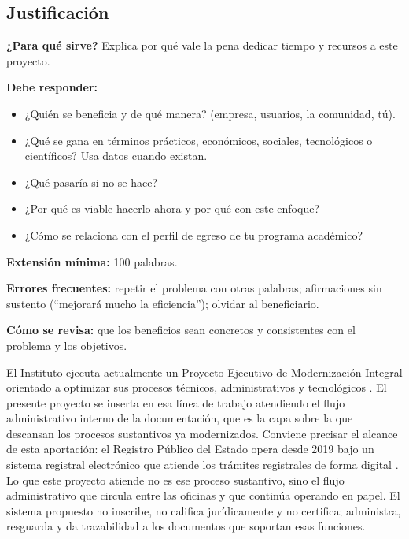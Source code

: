 \subsection{Justificación} \label{sec:justificacion} %

\begin{guia}
\textbf{¿Para qué sirve?} Explica por qué vale la pena dedicar tiempo y recursos a este proyecto.

\textbf{Debe responder:}
\begin{itemize}[nosep,leftmargin=*]
  \item ¿Quién se beneficia y de qué manera? (empresa, usuarios, la comunidad, tú).
  \item ¿Qué se gana en términos prácticos, económicos, sociales, tecnológicos o científicos? Usa datos cuando existan.
  \item ¿Qué pasaría si no se hace?
  \item ¿Por qué es viable hacerlo ahora y por qué con este enfoque?
  \item ¿Cómo se relaciona con el perfil de egreso de tu programa académico?
\end{itemize}

\textbf{Extensión mínima:} 100 palabras.

\textbf{Errores frecuentes:} repetir el problema con otras palabras; afirmaciones sin sustento (``mejorará mucho la
eficiencia''); olvidar al beneficiario.

\textbf{Cómo se revisa:} que los beneficios sean concretos y consistentes con el problema y los objetivos.
\end{guia}

El Instituto ejecuta actualmente un Proyecto Ejecutivo de Modernización Integral orientado a optimizar sus procesos técnicos, administrativos y tecnológicos \cite{tamaulipas2025mod}. El presente proyecto se inserta en esa línea de trabajo atendiendo el flujo administrativo interno de la documentación, que es la capa sobre la que descansan los procesos sustantivos ya modernizados. Conviene precisar el alcance de esta aportación: el Registro Público del Estado opera desde 2019 bajo un sistema registral electrónico que atiende los trámites registrales de forma digital \cite{futuver2024}. Lo que este proyecto atiende no es ese proceso sustantivo, sino el flujo administrativo que circula entre las oficinas y que continúa operando en papel. El sistema propuesto no inscribe, no califica jurídicamente y no certifica; administra, resguarda y da trazabilidad a los documentos que soportan esas funciones.

